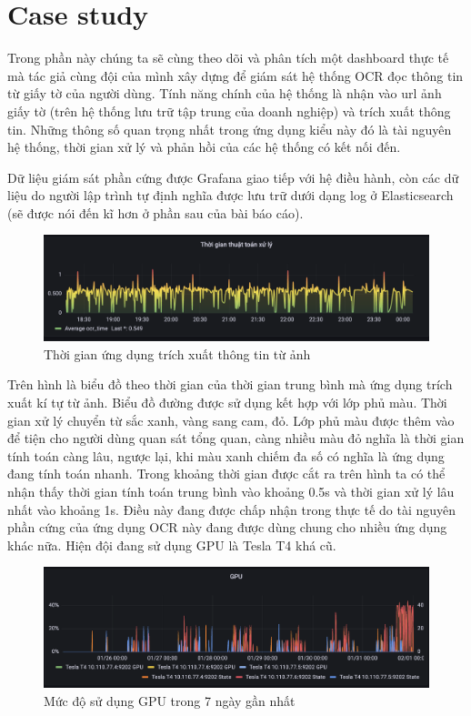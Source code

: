 \section{Case study}
Trong phần này chúng ta sẽ cùng theo dõi và phân tích một dashboard thực tế mà tác giả cùng đội của mình xây dựng để giám sát hệ thống OCR đọc thông tin từ giấy tờ của người dùng. Tính năng chính của hệ thống là nhận vào url ảnh giấy tờ (trên hệ thống lưu trữ tập trung của doanh nghiệp) và trích xuất thông tin. Những thông số quan trọng nhất trong ứng dụng kiểu này đó là tài nguyên hệ thống, thời gian xử lý và phản hồi của các hệ thống có kết nối đến. 

Dữ liệu giám sát phần cứng được Grafana giao tiếp với hệ điều hành, còn các dữ liệu do người lập trình tự định nghĩa được lưu trữ dưới dạng log ở Elasticsearch (sẽ được nói đến kĩ hơn ở phần sau của bài báo cáo).

\begin{figure}[H] %
    \centering %
    \includegraphics[width=1\textwidth]{figures/computing_time.png} 
    \caption{Thời gian ứng dụng trích xuất thông tin từ ảnh} %
    \label{fig:elk_01}
\end{figure}

Trên hình là biểu đồ theo thời gian của thời gian trung bình mà ứng dụng trích xuất kí tự từ ảnh. Biểu đồ đường được sử dụng kết hợp với lớp phủ màu. Thời gian xử lý chuyển từ sắc xanh, vàng sang cam, đỏ. Lớp phủ màu được thêm vào để tiện cho người dùng quan sát tổng quan, càng nhiều màu đỏ nghĩa là thời gian tính toán càng lâu, ngược lại, khi màu xanh chiếm đa số có nghĩa là ứng dụng đang tính toán nhanh. Trong khoảng thời gian được cắt ra trên hình ta có thể nhận thấy thời gian tính toán trung bình vào khoảng 0.5s và thời gian xử lý lâu nhất vào khoảng 1s. Điều này đang được chấp nhận trong thực tế do tài nguyên phần cứng của ứng dụng OCR này đang được dùng chung cho nhiều ứng dụng khác nữa. Hiện đội đang sử dụng GPU là Tesla T4 khá cũ. 

\begin{figure}[H] %
    \centering %
    \includegraphics[width=1\textwidth]{figures/gpu_usage.png} 
    \caption{Mức độ sử dụng GPU trong 7 ngày gần nhất} %
    \label{fig:elk_01}
\end{figure}

